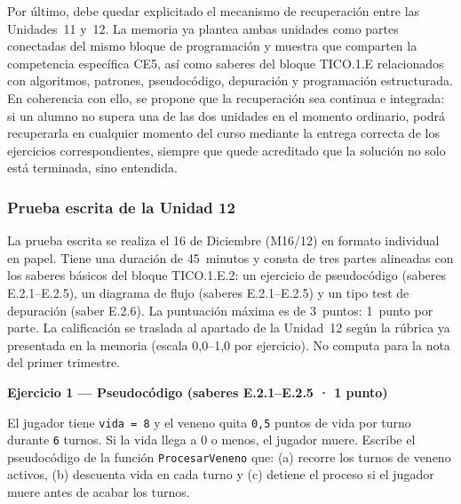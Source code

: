 \documentclass[a4paper,12pt]{article}
\begin{document}
Por último, debe quedar explicitado el mecanismo de recuperación entre las Unidades~11 y~12. La memoria ya plantea ambas unidades como partes conectadas del mismo bloque de programación y muestra que comparten la competencia específica CE5, así como saberes del bloque TICO.1.E relacionados con algoritmos, patrones, pseudocódigo, depuración y programación estructurada. En coherencia con ello, se propone que la recuperación sea continua e integrada: si un alumno no supera una de las dos unidades en el momento ordinario, podrá recuperarla en cualquier momento del curso mediante la entrega correcta de los ejercicios correspondientes, siempre que quede acreditado que la solución no solo está terminada, sino entendida.



\subsubsection*{Prueba escrita de la Unidad 12}

La prueba escrita se realiza el 16 de Diciembre (M16/12) en formato individual en papel. Tiene una duración de 45~minutos y consta de tres partes alineadas con los saberes básicos del bloque TICO.1.E.2: un ejercicio de pseudocódigo (saberes E.2.1--E.2.5), un diagrama de flujo (saberes E.2.1--E.2.5) y un tipo test de depuración (saber E.2.6). La puntuación máxima es de 3~puntos: 1~punto por parte. La calificación se traslada al apartado de la Unidad~12 según la rúbrica ya presentada en la memoria (escala 0,0--1,0 por ejercicio). No computa para la nota del primer trimestre.

\vspace{0.3cm}
\noindent{}

\vspace{0.4cm}
\noindent\textbf{Ejercicio 1 — Pseudocódigo \small(saberes E.2.1–E.2.5 · 1 punto)\normalsize}

\vspace{0.15cm}
\noindent El jugador tiene \texttt{vida = 8} y el veneno quita \texttt{0,5} puntos de vida por turno durante \texttt{6} turnos. Si la vida llega a 0 o menos, el jugador muere. Escribe el pseudocódigo de la función \texttt{ProcesarVeneno} que: (a) recorre los turnos de veneno activos, (b) descuenta vida en cada turno y (c) detiene el proceso si el jugador muere antes de acabar los turnos.
\end{document}
